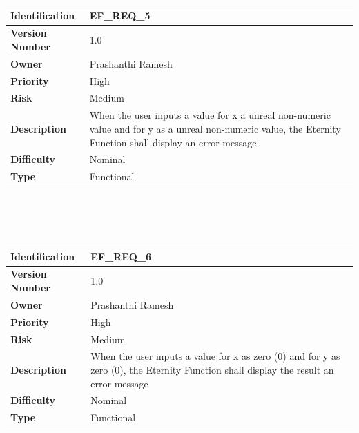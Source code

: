 \documentclass[11pt, english]{report}
\begin{document}
\setlength{\tabcolsep}{18pt}
\renewcommand{\arraystretch}{1.5}
\begin{tabular}{ |p{2.2cm}|p{9.8cm}| }
\hline
\textbf{Identification} &  EF\_REQ\_5 \\ \hline 
\textbf{Version Number} & 1.0 \\ \hline 
\textbf{Owner} & Prashanthi Ramesh  \\ \hline
\textbf{Priority} & High  \\ \hline
\textbf{Risk} & Medium  \\ \hline
\textbf{Description} & When the user inputs a value for x a unreal non-numeric value and for y as a unreal non-numeric value, the Eternity Function shall display an error message\\ \hline
\textbf{Difficulty} & Nominal  \\ \hline
\textbf{Type} & Functional \\ 
\hline
\end{tabular} \\ \\ \\

\setlength{\tabcolsep}{18pt}
\renewcommand{\arraystretch}{1.5}
\begin{tabular}{ |p{2.2cm}|p{9.8cm}| }
\hline
\textbf{Identification} &  EF\_REQ\_6 \\ \hline 
\textbf{Version Number} & 1.0 \\ \hline 
\textbf{Owner} & Prashanthi Ramesh  \\ \hline
\textbf{Priority} & High  \\ \hline
\textbf{Risk} & Medium  \\ \hline
\textbf{Description} & When the user inputs a value for x as zero (0) and for y as zero (0), the Eternity Function shall display the result an error message\\ \hline
\textbf{Difficulty} & Nominal  \\ \hline
\textbf{Type} & Functional \\ 
\hline
\end{tabular} \\ \\ \\ 
\end{document}
